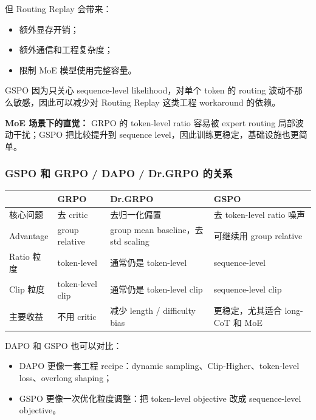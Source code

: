 但 Routing Replay 会带来：

\begin{itemize}[leftmargin=1.5em]
  \item 额外显存开销；
  \item 额外通信和工程复杂度；
  \item 限制 MoE 模型使用完整容量。
\end{itemize}

GSPO 因为只关心 sequence-level likelihood，对单个 token 的 routing 波动不那么敏感，因此可以减少对 Routing Replay 这类工程 workaround 的依赖。

\begin{summarybox}
\textbf{MoE 场景下的直觉：} GRPO 的 token-level ratio 容易被 expert routing 局部波动干扰；GSPO 把比较提升到 sequence level，因此训练更稳定，基础设施也更简单。
\end{summarybox}

\subsubsection{GSPO 和 GRPO / DAPO / Dr.GRPO 的关系}

\begin{center}
{\small
\begin{tabular}{p{2.7cm}p{3.2cm}p{3.3cm}p{3.3cm}}
\hline
 & \textbf{GRPO} & \textbf{Dr.GRPO} & \textbf{GSPO} \\
\hline
核心问题
&
去 critic
&
去归一化偏置
&
去 token-level ratio 噪声
\\
Advantage
&
group relative
&
group mean baseline，去 std scaling
&
可继续用 group relative
\\
Ratio 粒度
&
token-level
&
通常仍是 token-level
&
sequence-level
\\
Clip 粒度
&
token-level clip
&
通常仍是 token-level clip
&
sequence-level clip
\\
主要收益
&
不用 critic
&
减少 length / difficulty bias
&
更稳定，尤其适合 long-CoT 和 MoE
\\
\hline
\end{tabular}
}
\end{center}

DAPO 和 GSPO 也可以对比：

\begin{itemize}[leftmargin=1.5em]
  \item DAPO 更像一套工程 recipe：dynamic sampling、Clip-Higher、token-level loss、overlong shaping；
  \item GSPO 更像一次优化粒度调整：把 token-level objective 改成 sequence-level objective。
\end{itemize}

